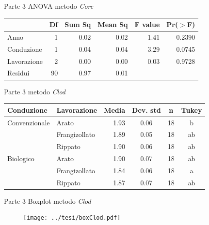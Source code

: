 \documentclass[10pt]{beamer}
\begin{document}
\begin{frame}{Parte 3 \small{ ANOVA metodo  \emph{Core}} }
  \begin{table}[ht]
    \centering
    \label{tab:anova del modello}
    \begin{tabular}{lrrrrr}
      \hline
                   & Df & Sum Sq & Mean Sq & F value & Pr($>$F) \\ 
      \hline 
      Anno         & 1  &  0.02  &  0.02  &   1.41   & 0.2390   \\ 
      Conduzione   & 1  &  0.04  &  0.04  &   3.29   & 0.0745   \\ 
      Lavorazione  & 2  &  0.00  &  0.00  &   0.03   & 0.9728   \\ 
      Residui      & 90 &  0.97  &  0.01  &          &          \\ 
      \hline
    \end{tabular}
  \end{table}
\end{frame}

\begin{frame}[label=Clod]{Parte 3 \small{ metodo \emph{Clod}}}
  \hyperlink{finale}{}
  \footnotesize
  \begin{table}[ht]
    \centering
    \begin{tabular}{llrccc}
      \hline
      Conduzione    & Lavorazione   & Media& Dev. std & n    & Tukey \\ 
      \hline
      Convenzionale & Arato         & 1.93 & 0.06      &  18 & b     \\ 
                    & Frangizollato & 1.89 & 0.05      &  18 & ab    \\ 
                    & Rippato       & 1.90 & 0.06      &  18 & ab    \\ 
      Biologico     & Arato         & 1.90 & 0.07      &  18 & ab    \\ 
                    & Frangizollato & 1.84 & 0.06      &  18 & a     \\ 
                    & Rippato       & 1.87 & 0.07      &  18 & ab    \\ 
      \hline
    \end{tabular}
    \label{tab:RiassuntoDensitaSpinta}
  \end{table}
\end{frame}

\begin{frame}{Parte 3 \small{Boxplot metodo \emph{Clod}}} 
  \begin{figure}
    \texttt{[image: ../tesi/boxClod.pdf]}
  \end{figure}
\end{frame}
\end{document}
